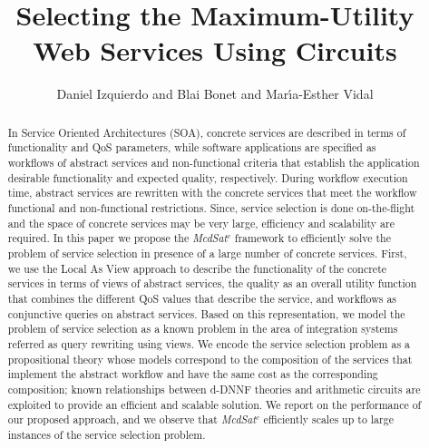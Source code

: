 \documentclass{llncs}
\begin{document}
\allowdisplaybreaks
\title{Selecting the Maximum-Utility  Web Services  Using Circuits}
\author{Daniel Izquierdo   and Blai Bonet   and Mar\'{\i}a-Esther Vidal }

 \maketitle
\begin{abstract}
In Service Oriented Architectures (SOA), concrete services are described in terms of functionality   and QoS parameters, while software applications are specified as workflows of abstract services and non-functional criteria that establish the  application desirable functionality and  expected quality, respectively.  During workflow execution time,  abstract services  are rewritten 
with the concrete services  that meet the workflow  functional and non-functional restrictions. Since, service selection is done on-the-flight and the space of concrete services may be very large, efficiency and scalability are required.  In this paper we propose the {\it McdSat}$^c$ framework to efficiently solve the problem of service selection in presence of a large number of concrete services.
First, we use the Local As View approach to describe the functionality  of the concrete services in terms of views of abstract services, the quality as an overall utility function that combines the different QoS values that describe the service, and  workflows as  conjunctive queries on abstract services. Based on this representation, we 
model the problem of service selection as a known problem in the area of integration systems referred as query rewriting using views.  We encode the service selection problem as a propositional theory whose models correspond to the composition of the services that implement the abstract workflow and have the same cost as the corresponding composition; known relationships between d-DNNF theories and arithmetic circuits are exploited to provide an efficient and scalable solution.  We report on the performance of our proposed approach, and we observe that  {\it McdSat}$^c$  efficiently scales up to large instances of the service selection problem.  
 
 
\end{abstract}                
\end{document}
